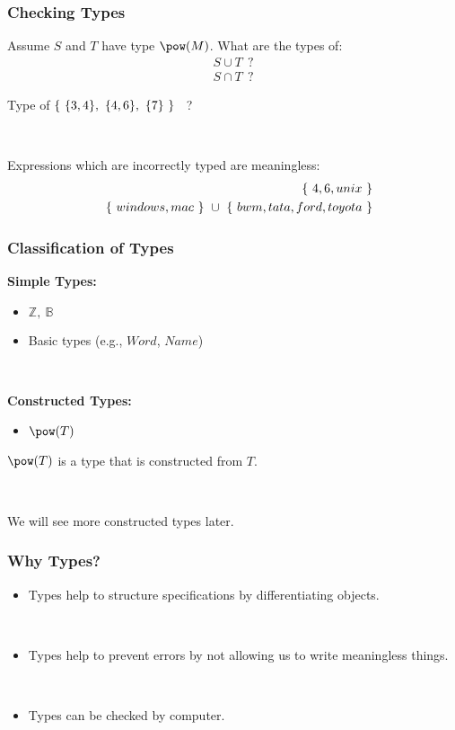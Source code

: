 \documentclass{beamer}
\begin{document}
\begin{frame}

\frametitle{Checking Types}

Assume $S$ and $T$ have type $\power(M)$. What are the types of:
\begin{eqnarray*}
    S \cup T ~~?\\
    S \cap T ~~?
\end{eqnarray*}


Type of $\{~ \{3,4\},~ \{4,6\},~ \{7\} ~\}$~ ?

~

Expressions which are incorrectly typed are meaningless:
\begin{eqnarray*}
    &&\{~ 4, 6, unix ~\} \\
    &&\{~windows, mac ~\} ~\cup~ \{~ bwm, tata, ford, toyota~\}
\end{eqnarray*}

\end{frame}





\begin{frame}
\frametitle{Classification of Types}

{\bf Simple Types:}
\begin{itemize}\setlength{\itemsep}{0pt}
\item $\mathbb{Z},~  \mathbb{B}$
 \item Basic types
(e.g., $Word$, $Name$) 
\end{itemize}

~

{\bf Constructed Types:} ~~
\begin{itemize}\setlength{\itemsep}{0pt}
\item $\power(T)$
\end{itemize}

$\power(T)$ is a type that is \alert{constructed} from $T$. 

~

We will see more constructed types later.
\end{frame}





\begin{frame}

\frametitle{Why Types?}
\begin{itemize}
\item Types help to structure specifications by differentiating objects.

~

\item Types help to prevent errors by not allowing
 us to write meaningless things.

~

\item Types can be checked by computer.
\end{itemize}


\end{frame}
\end{document}
